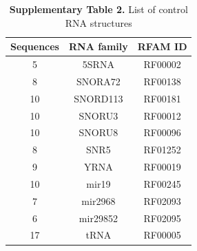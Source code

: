 \documentclass{bmcart}
\begin{document}
\begin{table}
\centering
\caption*{\textbf{Supplementary Table 2.}  List of control RNA structures }
\begin{tabular}{ccc}
\hline
Sequences & RNA family & RFAM ID \\
\hline
   5 & 5SRNA & RF00002 \\
   8 & SNORA72 & RF00138 \\
  10 & SNORD113 & RF00181\\
  10 & SNORU3 & RF00012\\
  10 & SNORU8 & RF00096\\
   8 & SNR5 & RF01252\\
   9 & YRNA & RF00019\\
  10 & mir19 & RF00245\\
   7 & mir2968 & RF02093\\
   6 & mir29852 & RF02095\\
  17 & tRNA & RF00005\\
\hline
\end{tabular}
\end{table}
\end{document}
